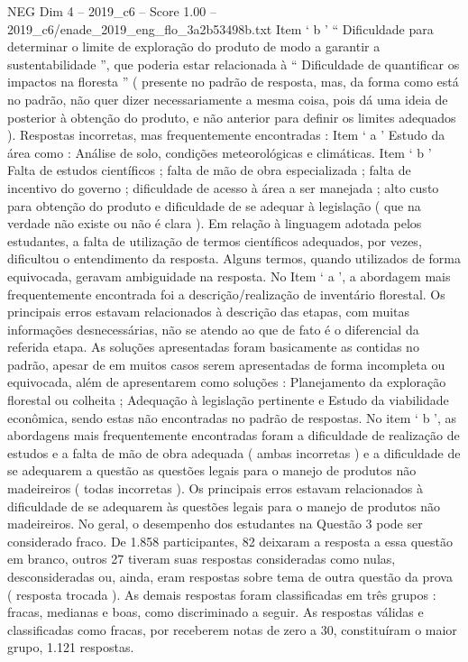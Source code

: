 \begin{textsample}{NEG Dim 4 – 2019\_c6 – Score 1.00 – 2019\_c6/enade\_2019\_eng\_flo\_3a2b53498b.txt}
Item ‘ b ’ “ Dificuldade para determinar o limite de exploração do produto de modo a garantir a sustentabilidade ”, que poderia estar relacionada à “ Dificuldade de quantificar os impactos na floresta ” ( presente no padrão de resposta, mas, da forma como está no padrão, não quer dizer necessariamente a mesma coisa, pois dá uma ideia de posterior à obtenção do produto, e não anterior para definir os limites adequados ).
Respostas incorretas, mas frequentemente encontradas : Item ‘ a ’ Estudo da área como : Análise de solo, condições meteorológicas e climáticas.
Item ‘ b ’ Falta de estudos científicos ; falta de mão de obra especializada ; falta de incentivo do governo ; dificuldade de acesso à área a ser manejada ; alto custo para obtenção do produto e dificuldade de se adequar à legislação ( que na verdade não existe ou não é clara ).
Em relação à linguagem adotada pelos estudantes, a falta de utilização de termos científicos adequados, por vezes, dificultou o entendimento da resposta.
Alguns termos, quando utilizados de forma equivocada, geravam ambiguidade na resposta.
No Item ‘ a ’, a abordagem mais frequentemente encontrada foi a descrição/realização de inventário florestal.
Os principais erros estavam relacionados à descrição das etapas, com muitas informações desnecessárias, não se atendo ao que de fato é o diferencial da referida etapa.
As soluções apresentadas foram basicamente as contidas no padrão, apesar de em muitos casos serem apresentadas de forma incompleta ou equivocada, além de apresentarem como soluções : Planejamento da exploração florestal ou colheita ; Adequação à legislação pertinente e Estudo da viabilidade econômica, sendo estas não encontradas no padrão de respostas.
No item ‘ b ’, as abordagens mais frequentemente encontradas foram a dificuldade de realização de estudos e a falta de mão de obra adequada ( ambas incorretas ) e a dificuldade de se adequarem a questão as questões legais para o manejo de produtos não madeireiros ( todas incorretas ).
Os principais erros estavam relacionados à dificuldade de se adequarem às questões legais para o manejo de produtos não madeireiros.
No geral, o desempenho dos estudantes na Questão 3 pode ser considerado fraco.
De 1.858 participantes, 82 deixaram a resposta a essa questão em branco, outros 27 tiveram suas respostas consideradas como nulas, desconsideradas ou, ainda, eram respostas sobre tema de outra questão da prova ( resposta trocada ).
As demais respostas foram classificadas em três grupos : fracas, medianas e boas, como discriminado a seguir.
As respostas válidas e classificadas como fracas, por receberem notas de zero a 30, constituíram o maior grupo, 1.121 respostas.

\end{textsample}

